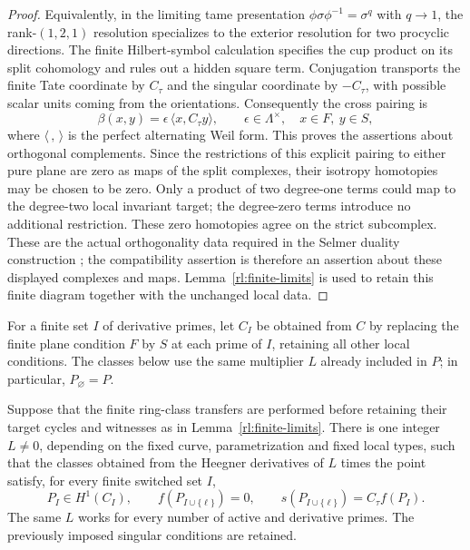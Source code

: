 \begin{proof}
Equivalently, in the limiting tame presentation
\(\phi\sigma\phi^{-1}=\sigma^q\) with \(q\to1\), the
rank-\((1,2,1)\) resolution specializes to the exterior
resolution for two procyclic directions.  The finite
Hilbert-symbol calculation specifies the cup product on
its split cohomology and rules out a hidden square term.
Conjugation transports the finite Tate coordinate by \(C_\tau\) and the
singular coordinate by \(-C_\tau\), with possible scalar units coming from
the orientations.  Consequently the cross pairing is
\begin{equation}
 \beta(x,y)=\epsilon\,\langle x,C_\tau y\rangle,\qquad
 \epsilon\in\Lambda^\times,\quad x\in F,\ y\in S,
 \label{eq:h:cross-pairing}
\end{equation}
where \(\langle\, ,\,\rangle\) is the perfect alternating Weil form.
This proves the assertions about orthogonal complements.  Since the
restrictions of this explicit pairing to either pure plane are zero as
maps of the split complexes, their isotropy homotopies may be chosen to
be zero.  Only a product of two degree-one terms could map to the
degree-two local invariant target; the degree-zero terms introduce
no additional restriction.  These zero homotopies agree on the
strict subcomplex.  These are the actual
orthogonality data required in the Selmer duality construction
\cite[Theorem~6.3.4]{Nekovar2006}; the compatibility assertion is therefore
an assertion about these displayed complexes and maps.  Lemma~\ref{rl:finite-limits} is used to retain this finite diagram together
with the unchanged local data.
\end{proof}

For a finite set $I$ of derivative primes, let $C_I$ be obtained
from $C$ by replacing the finite plane condition $F$ by $S$ at each
prime of $I$, retaining all other local conditions. The classes below
use the same multiplier $L$ already included in $P$; in particular,
$P_{\varnothing}=P$.

\begin{lemma}\label{rd:derivative}\label{lem:h:derivative-classes}
Suppose that the finite ring-class transfers are performed before
retaining their target cycles and witnesses as in
Lemma~\ref{rl:finite-limits}. There is one
integer \(L\ne0\), depending on the fixed curve, parametrization and
fixed local types, such that the classes obtained from the Heegner
derivatives of \(L\) times the point satisfy, for every finite switched
set \(I\),
\begin{equation}
 P_I\in H^1(C_I),\qquad
 f(P_{I\cup\{\ell\}})=0,\qquad
 s(P_{I\cup\{\ell\}})=C_\tau f(P_I).
 \label{eq:h:finite-singular}
\end{equation}
The same \(L\) works for every number of active and derivative primes.
The previously imposed singular conditions are retained.
\end{lemma}

